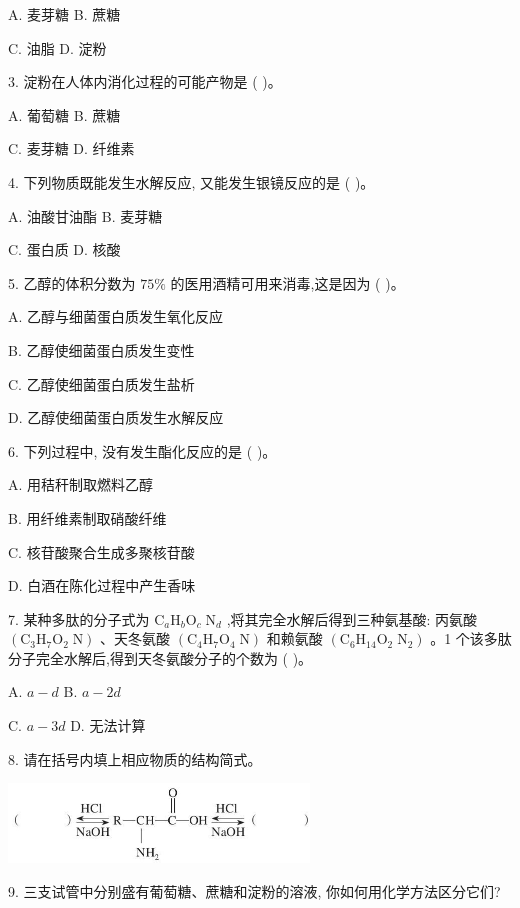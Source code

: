 \documentclass[10pt]{article}
\begin{document}
A. 麦芽糖 B. 蔗糖

C. 油脂 D. 淀粉

3. 淀粉在人体内消化过程的可能产物是 ( )。

A. 葡萄糖 B. 蔗糖

C. 麦芽糖 D. 纤维素

4. 下列物质既能发生水解反应, 又能发生银镜反应的是 ( )。

A. 油酸甘油酯 B. 麦芽糖

C. 蛋白质 D. 核酸

5. 乙醇的体积分数为 \({75}\%\) 的医用酒精可用来消毒,这是因为 ( )。

A. 乙醇与细菌蛋白质发生氧化反应

B. 乙醇使细菌蛋白质发生变性

C. 乙醇使细菌蛋白质发生盐析

D. 乙醇使细菌蛋白质发生水解反应

6. 下列过程中, 没有发生酯化反应的是 ( )。

A. 用秸秆制取燃料乙醇

B. 用纤维素制取硝酸纤维

C. 核苷酸聚合生成多聚核苷酸

D. 白酒在陈化过程中产生香味

7. 某种多肽的分子式为 \({\mathrm{C}}_{a}{\mathrm{H}}_{b}{\mathrm{O}}_{c}{\mathrm{\;N}}_{d}\) ,将其完全水解后得到三种氨基酸: 丙氨酸 \(\left( {{\mathrm{C}}_{3}{\mathrm{H}}_{7}{\mathrm{O}}_{2}\mathrm{\;N}}\right)\) 、天冬氨酸 \(\left( {{\mathrm{C}}_{4}{\mathrm{H}}_{7}{\mathrm{O}}_{4}\mathrm{\;N}}\right)\) 和赖氨酸 \(\left( {{\mathrm{C}}_{6}{\mathrm{H}}_{14}{\mathrm{O}}_{2}{\mathrm{\;N}}_{2}}\right)\) 。1 个该多肽分子完全水解后,得到天冬氨酸分子的个数为 ( )。

A. \(a - d\) B. \(a - {2d}\)

C. \(a - {3d}\) D. 无法计算

8. 请在括号内填上相应物质的结构简式。

\begin{center}
\includegraphics[max width=0.6\textwidth]{images/0190efc5-b58a-7c43-bfb0-e0a030df9cfd_133_600685.jpg}
\end{center}

9. 三支试管中分别盛有葡萄糖、蔗糖和淀粉的溶液, 你如何用化学方法区分它们?
\end{document}
